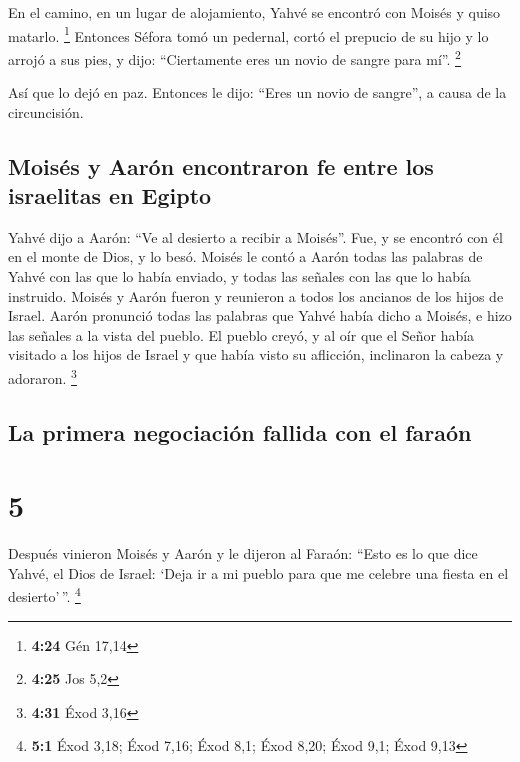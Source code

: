  En el camino, en un lugar de alojamiento, Yahvé se
encontró con Moisés y quiso matarlo. \footnote{\textbf{4:24} Gén 17,14}
 Entonces Séfora tomó un pedernal, cortó el prepucio de
su hijo y lo arrojó a sus pies, y dijo: ``Ciertamente eres un novio de
sangre para mí''. \footnote{\textbf{4:25} Jos 5,2}

 Así que lo dejó en paz. Entonces le dijo: ``Eres un
novio de sangre'', a causa de la circuncisión.

\hypertarget{moisuxe9s-y-aaruxf3n-encontraron-fe-entre-los-israelitas-en-egipto}{%
\subsection{Moisés y Aarón encontraron fe entre los israelitas en
Egipto}\label{moisuxe9s-y-aaruxf3n-encontraron-fe-entre-los-israelitas-en-egipto}}

 Yahvé dijo a Aarón: ``Ve al desierto a recibir a
Moisés''. Fue, y se encontró con él en el monte de Dios, y lo besó.
 Moisés le contó a Aarón todas las palabras de Yahvé con
las que lo había enviado, y todas las señales con las que lo había
instruido.  Moisés y Aarón fueron y reunieron a todos los
ancianos de los hijos de Israel.  Aarón pronunció todas
las palabras que Yahvé había dicho a Moisés, e hizo las señales a la
vista del pueblo.  El pueblo creyó, y al oír que el Señor
había visitado a los hijos de Israel y que había visto su aflicción,
inclinaron la cabeza y adoraron. \footnote{\textbf{4:31} Éxod 3,16}

\hypertarget{la-primera-negociaciuxf3n-fallida-con-el-farauxf3n}{%
\subsection{La primera negociación fallida con el
faraón}\label{la-primera-negociaciuxf3n-fallida-con-el-farauxf3n}}

\hypertarget{section-4}{%
\section{5}\label{section-4}}

 Después vinieron Moisés y Aarón y le dijeron al Faraón:
``Esto es lo que dice Yahvé, el Dios de Israel: `Deja ir a mi pueblo
para que me celebre una fiesta en el desierto'\,''. \footnote{\textbf{5:1}
  Éxod 3,18; Éxod 7,16; Éxod 8,1; Éxod 8,20; Éxod 9,1; Éxod 9,13}

